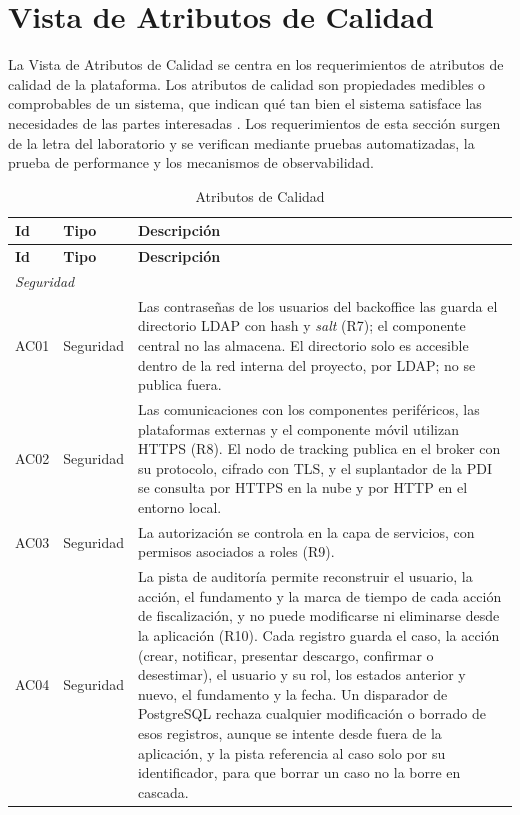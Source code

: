 \section{Vista de Atributos de Calidad}\label{sec:vista-calidad-de-servicio}

La Vista de Atributos de Calidad se centra en los requerimientos de atributos de calidad de la plataforma. Los atributos de calidad son propiedades medibles o comprobables de un sistema, que indican qué tan bien el sistema satisface las necesidades de las partes interesadas \cite{Bass2012}. Los requerimientos de esta sección surgen de la letra del laboratorio \cite{LINS2026} y se verifican mediante pruebas automatizadas, la prueba de performance y los mecanismos de observabilidad.

\begin{longtable}{|p{1.3cm}|p{2.7cm}|p{11.5cm}|}
    \caption{Atributos de Calidad}\label{tab:calidad}\\
    \hline
    \textbf{Id} & \textbf{Tipo} & \textbf{Descripción} \\
    \hline
    \endfirsthead
    \hline
    \textbf{Id} & \textbf{Tipo} & \textbf{Descripción} \\
    \hline
    \endhead
    \multicolumn{3}{|l|}{\textit{Seguridad}} \\
    \hline
    AC01 & Seguridad & Las contraseñas de los usuarios del backoffice las guarda el directorio LDAP con hash y \textit{salt} (R7); el componente central no las almacena. El directorio solo es accesible dentro de la red interna del proyecto, por LDAP; no se publica fuera. \\
    \hline
    AC02 & Seguridad & Las comunicaciones con los componentes periféricos, las plataformas externas y el componente móvil utilizan HTTPS (R8). El nodo de tracking publica en el broker con su protocolo, cifrado con TLS, y el suplantador de la PDI se consulta por HTTPS en la nube y por HTTP en el entorno local. \\
    \hline
    AC03 & Seguridad & La autorización se controla en la capa de servicios, con permisos asociados a roles (R9). \\
    \hline
    AC04 & Seguridad & La pista de auditoría permite reconstruir el usuario, la acción, el fundamento y la marca de tiempo de cada acción de fiscalización, y no puede modificarse ni eliminarse desde la aplicación (R10). Cada registro guarda el caso, la acción (crear, notificar, presentar descargo, confirmar o desestimar), el usuario y su rol, los estados anterior y nuevo, el fundamento y la fecha. Un disparador de PostgreSQL rechaza cualquier modificación o borrado de esos registros, aunque se intente desde fuera de la aplicación, y la pista referencia al caso solo por su identificador, para que borrar un caso no la borre en cascada. \\

\end{longtable}
